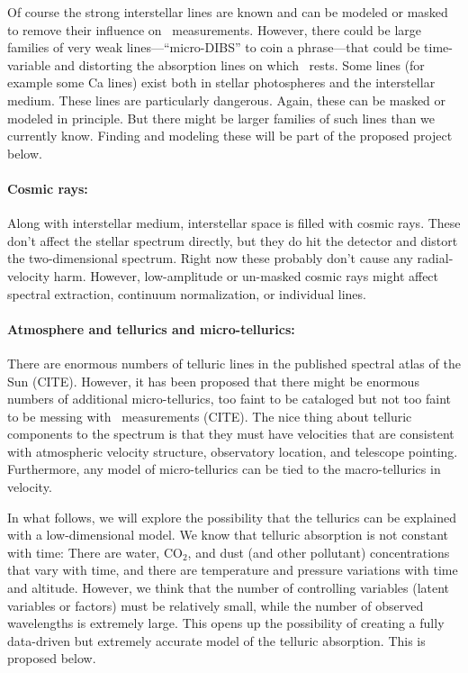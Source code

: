\documentclass[12pt, fullpage, letterpaper]{article}
\begin{document}
Of course the strong interstellar lines are known and can be modeled or masked
to remove their influence on \EPRV\ measurements.
However, there could be large families of very weak
lines---``micro-DIBS'' to coin a phrase---that could be time-variable
and distorting the absorption lines on which \EPRV\ rests.
Some lines (for example some Ca lines) exist both in stellar photospheres
and the interstellar medium. These lines are particularly dangerous.
Again, these can be masked or modeled in principle. But there might be
larger families of such lines than we currently know.
Finding and modeling these will be part of the proposed project below.

\paragraph{Cosmic rays:}
Along with interstellar medium, interstellar space is filled with cosmic
rays.
These don't affect the stellar spectrum directly, but they do hit the detector
and distort the two-dimensional spectrum.
Right now these probably don't cause any radial-velocity harm.
However, low-amplitude or un-masked cosmic rays might affect spectral extraction,
continuum normalization, or individual lines.

\paragraph{Atmosphere and tellurics and micro-tellurics:}
There are enormous numbers of telluric lines in the published spectral atlas
of the Sun (CITE). However, it has been proposed that there might be enormous
numbers of additional micro-tellurics, too faint to be cataloged but not too faint
to be messing with \EPRV\ measurements (CITE).
The nice thing about telluric components to the spectrum is that they must
have velocities that are consistent with atmospheric velocity structure,
observatory location,  and telescope pointing.
Furthermore, any model of micro-tellurics can be tied to the macro-tellurics
in velocity.

In what follows, we will explore the possibility that the tellurics can be
explained with a low-dimensional model.
We know that telluric absorption is not constant with time: There are water,
CO$_2$, and dust (and other pollutant) concentrations that vary with time, and
there are temperature and pressure variations with time and altitude.
However, we think that the number of controlling variables (latent variables or
factors) must be relatively small, while the number of observed wavelengths is
extremely large.
This opens up the possibility of creating a fully data-driven but extremely accurate
model of the telluric absorption. This is proposed below.
\end{document}
